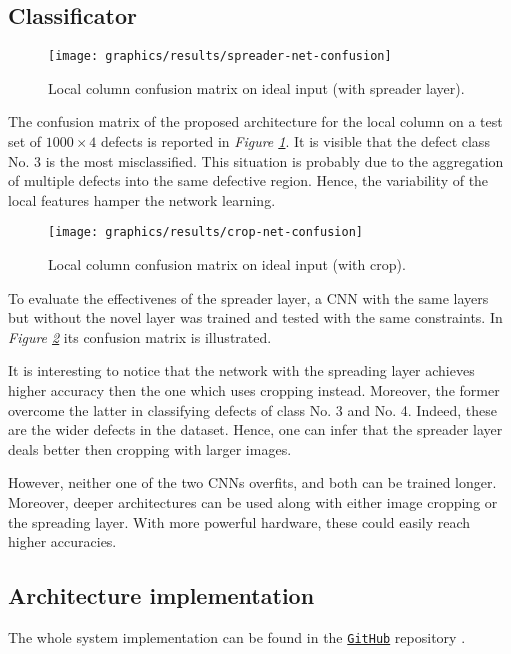     \subsection{Classificator}
    \begin{figure}
        \centering
        \texttt{[image: graphics/results/spreader-net-confusion]}
        \caption{Local column confusion matrix on ideal input (with spreader layer).}\label{fig:local-confusion-spreader}
    \end{figure}
    \par{
        The confusion matrix of the proposed architecture for the local column on a test set of $1000\times 4$ defects is reported in \emph{Figure \ref{fig:local-confusion-spreader}}. It is visible that the defect class No. 3 is the most misclassified. This situation is probably due to the aggregation of multiple defects into the same defective region. Hence, the variability of the local features hamper the network learning.
    }
    \begin{figure}
        \centering
        \texttt{[image: graphics/results/crop-net-confusion]}
        \caption{Local column confusion matrix on ideal input (with crop).}\label{fig:local-confusion-crop}
    \end{figure}
    \par{
        To evaluate the effectivenes of the spreader layer, a CNN with the same layers but without the novel layer was trained and tested with the same constraints. In \emph{Figure \ref{fig:local-confusion-crop}} its confusion matrix is illustrated.
    }
    \par{
        It is interesting to notice that the network with the spreading layer achieves higher accuracy then the one which uses cropping instead. Moreover, the former overcome the latter in classifying defects of class No. 3 and No. 4. Indeed, these are the wider defects in the dataset. Hence, one can infer that the spreader layer deals better then cropping with larger images.
    }
    \par{
        However, neither one of the two CNNs overfits, and both can be trained longer. Moreover, deeper architectures can be used along with either image cropping or the spreading layer. With more powerful hardware, these could easily reach higher accuracies. 
    }
    \subsection{Architecture implementation}
    \par{
        The whole system implementation can be found in the \href{https://github.com/antonioterpin/wavelet_ml}{\texttt{GitHub}} repository \cite{antonioterpin:github}.
    }


